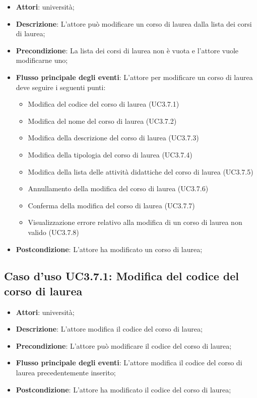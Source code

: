 \begin{itemize}
\item \textbf{Attori}: università;
\item \textbf{Descrizione}: L'attore può modificare un corso di laurea dalla lista dei corsi di laurea;

\item \textbf{Precondizione}: La lista dei corsi di laurea non è vuota e l'attore vuole modificarne uno;

\item \textbf{Flusso principale degli eventi}: L'attore per modificare un corso di laurea deve seguire i seguenti punti:

\begin{itemize}
\item Modifica del codice del corso di laurea (UC3.7.1)
\item Modifica del nome del corso di laurea (UC3.7.2)
\item Modifica della descrizione del corso di laurea (UC3.7.3)
\item Modifica della tipologia del corso di laurea (UC3.7.4)
\item Modifica della lista delle attività didattiche del corso di laurea (UC3.7.5)
\item Annullamento della modifica del corso di laurea (UC3.7.6)
\item Conferma della modifica del corso di laurea (UC3.7.7)
\item Visualizzazione errore relativo alla modifica di un corso di laurea non valido (UC3.7.8)
\end{itemize}
\item \textbf{Postcondizione}: L'attore ha modificato un corso di laurea;

\end{itemize}
\subsection{Caso d'uso \texorpdfstring{UC3.7.1}{UC3.7.1}: Modifica del codice del corso di laurea}
\begin{itemize}
\item \textbf{Attori}: università;
\item \textbf{Descrizione}: L'attore modifica il codice del corso di laurea;

\item \textbf{Precondizione}: L'attore può modificare il codice del corso di laurea;

\item \textbf{Flusso principale degli eventi}: L'attore modifica il codice del corso di laurea precedentemente inserito;

\item \textbf{Postcondizione}: L'attore ha modificato il codice del corso di laurea;

\end{itemize}
